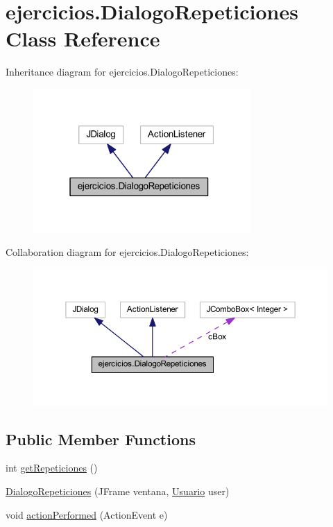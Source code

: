 \hypertarget{classejercicios_1_1_dialogo_repeticiones}{}\section{ejercicios.\+Dialogo\+Repeticiones Class Reference}
\label{classejercicios_1_1_dialogo_repeticiones}


Inheritance diagram for ejercicios.\+Dialogo\+Repeticiones\+:
\nopagebreak
\begin{figure}[H]
\begin{center}
\leavevmode
\includegraphics[width=235pt]{classejercicios_1_1_dialogo_repeticiones__inherit__graph}
\end{center}
\end{figure}


Collaboration diagram for ejercicios.\+Dialogo\+Repeticiones\+:
\nopagebreak
\begin{figure}[H]
\begin{center}
\leavevmode
\includegraphics[width=350pt]{classejercicios_1_1_dialogo_repeticiones__coll__graph}
\end{center}
\end{figure}
\subsection*{Public Member Functions}
\begin{DoxyCompactItemize}
\item 
int \mbox{\hyperlink{classejercicios_1_1_dialogo_repeticiones_a02413008932361f0cd47f23fcdff84e8}{get\+Repeticiones}} ()
\item 
\mbox{\hyperlink{classejercicios_1_1_dialogo_repeticiones_ac9d5534f42ead153528460e3b7a63b7b}{Dialogo\+Repeticiones}} (J\+Frame ventana, \mbox{\hyperlink{classclases_1_1_usuario}{Usuario}} user)
\item 
void \mbox{\hyperlink{classejercicios_1_1_dialogo_repeticiones_abcfac889878a9dcbc18c7a088cfb9d98}{action\+Performed}} (Action\+Event e)
\end{DoxyCompactItemize}


